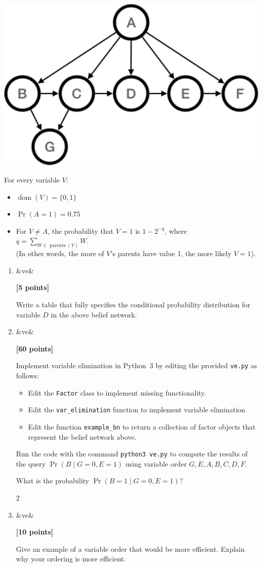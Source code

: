\documentclass{article}
\newcounter{totalpoints}
\newcommand{\points}[2][]{{\addtocounter{totalpoints}{#2}\ifx&#1&\else\addtocounter{#1}{#2}\fi\textbf{[#2 points]}}}
\begin{document}
\begin{enumerate}
\begin{center}
\includegraphics[width=.25\textwidth]{ve1.pdf}
\end{center}

For every variable $V$:
\begin{itemize}
\item $\operatorname{dom}(V) = \{0,1\}$
\item $\Pr(A=1) = 0.75$
\item For $V\ne A$, the probability that $V=1$ is $1-2^{-q}$, where
$q=\sum_{W\in\operatorname{parents}(V)}W$.\\
(In other words, the more of $V$'s parents have value 1, the more likely $V=1$).
\end{itemize}

\begin{enumerate}
\item\points[ve]{5}
Write a table that fully specifies the conditional probability distribution for variable $D$ in the above belief network.

\begin{answer}{1.75in}
\end{answer}

\item\points[ve]{60} \label{q:code}
Implement variable elimination in Python~3 by editing the provided \texttt{ve.py} as follows:
\begin{itemize}
\item Edit the \verb|Factor| class to implement missing functionality.
\item Edit the \verb|var_elimination| function to implement variable elimination
\item Edit the function \verb|example_bn| to return a collection of factor objects that represent the belief network above.
\end{itemize}
Run the code with the command \verb|python3 ve.py| to compute the results of the
query $\Pr(B\mid G=0,E=1)$ using variable order $G,E,A,B,C,D,F$.

What is the probability $\Pr(B=1\mid G=0,E=1)$?

\begin{answer}{2\baselineskip}
\end{answer}

\item\points[ve]{10}
Give an example of a variable order that would be more efficient.
Explain why your ordering is more efficient.

\begin{answer}{2in}
\end{answer}
\end{enumerate}

\clearpage

\end{enumerate}
\end{document}
